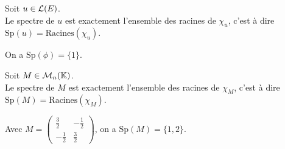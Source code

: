 \documentclass[a4paper]{book}
\begin{document}
\begin{Proposition}
Soit $u\in \mathcal{L}(E)$.\\
Le spectre de $u$ est exactement l'ensemble des racines de $\chi_u$, c'est à dire  $\mathrm{Sp}(u) = \mathrm{Racines}(\chi_u)$.
\end{Proposition}
\begin{Exemple} On a $\mathrm{Sp}(\phi) =\{1\}$.
\end{Exemple}
\begin{Proposition}
Soit $M\in \mathcal{M}_{n}(\mathbb{K})$.\\
Le spectre de $M$ est exactement l'ensemble des racines de $\chi_M$, c'est à dire  $\mathrm{Sp}(M) = \mathrm{Racines}(\chi_M)$.
\end{Proposition}
\begin{Exemple} Avec $M=\begin{pmatrix}\frac 3 2 &-\frac 1 2\\-\frac 1 2&\frac 3 2\end{pmatrix}$, on a $\mathrm{Sp}(M) =\{1,2\}$.
\end{Exemple}
\end{document}
